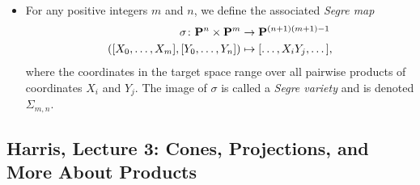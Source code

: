 \begin{itemize}
\item
  For any positive integers $m$ and $n$, we define the associated \emph{Segre map}
  \begin{align*}
    \sigma \colon \mathbf{P}^n \times \mathbf{P}^m &\rightarrow \mathbf{P}^{(n+1)(m+1)-1} \\
    ([X_0,\dots,X_m],[Y_0,\dots,Y_n]) &\mapsto [\dots,X_i Y_j,\dots],
  \end{align*}
  where the coordinates in the target space range over all pairwise products of coordinates $X_i$ and $Y_j$. The image of $\sigma$ is called a \emph{Segre variety} and is denoted $\Sigma_{m,n}$.
\end{itemize}

\subsection{Harris, Lecture 3: Cones, Projections, and More About Products}

